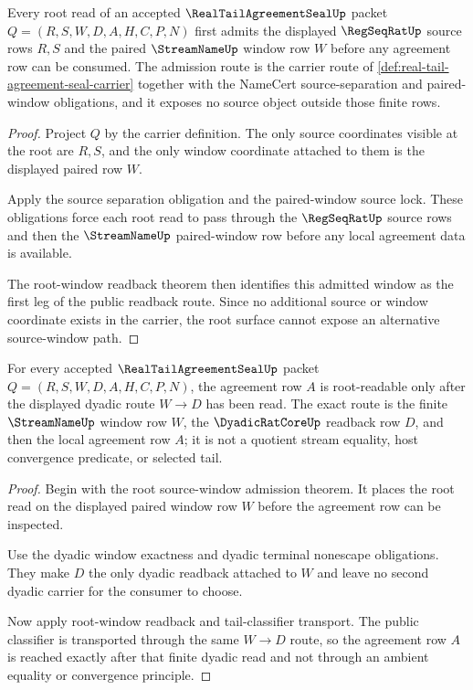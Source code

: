 \begin{theorem}
\label{thm:real-tail-agreement-seal-root-source-window-admission}
Every root read of an accepted $\RealTailAgreementSealUp$ packet $Q=(R,S,W,D,A,H,C,P,N)$ first admits the displayed $\RegSeqRatUp$ source rows $R,S$ and the paired $\StreamNameUp$ window row $W$ before any agreement row can be consumed. The admission route is the carrier route of \autoref{def:real-tail-agreement-seal-carrier} together with the NameCert source-separation and paired-window obligations, and it exposes no source object outside those finite rows.
\end{theorem}
\begin{proof}
Project $Q$ by the carrier definition. The only source coordinates visible at the root are $R,S$, and the only window coordinate attached to them is the displayed paired row $W$.

Apply the source separation obligation and the paired-window source lock. These obligations force each root read to pass through the $\RegSeqRatUp$ source rows and then the $\StreamNameUp$ paired-window row before any local agreement data is available.

The root-window readback theorem then identifies this admitted window as the first leg of the public readback route. Since no additional source or window coordinate exists in the carrier, the root surface cannot expose an alternative source-window path.
\end{proof}

\begin{theorem}
\label{thm:real-tail-agreement-seal-root-dyadic-agreement-exactness}
For every accepted $\RealTailAgreementSealUp$ packet $Q=(R,S,W,D,A,H,C,P,N)$, the agreement row $A$ is root-readable only after the displayed dyadic route $W \to D$ has been read. The exact route is the finite $\StreamNameUp$ window row $W$, the $\DyadicRatCoreUp$ readback row $D$, and then the local agreement row $A$; it is not a quotient stream equality, host convergence predicate, or selected tail.
\end{theorem}
\begin{proof}
Begin with the root source-window admission theorem. It places the root read on the displayed paired window row $W$ before the agreement row can be inspected.

Use the dyadic window exactness and dyadic terminal nonescape obligations. They make $D$ the only dyadic readback attached to $W$ and leave no second dyadic carrier for the consumer to choose.

Now apply root-window readback and tail-classifier transport. The public classifier is transported through the same $W \to D$ route, so the agreement row $A$ is reached exactly after that finite dyadic read and not through an ambient equality or convergence principle.
\end{proof}

